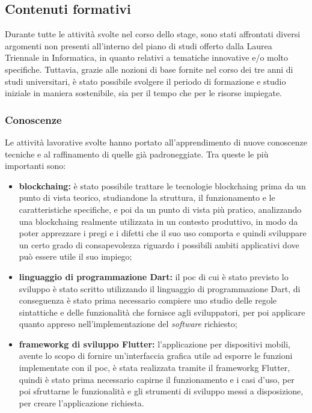 \subsection{Contenuti formativi}

Durante tutte le attività svolte nel corso dello stage, sono stati affrontati diversi argomenti non presenti all'interno del piano di studi offerto dalla Laurea Triennale in Informatica, in quanto relativi a tematiche innovative e/o molto specifiche. Tuttavia, grazie alle nozioni di base fornite nel corso dei tre anni di studi universitari, è stato possibile svolgere il periodo di formazione e studio iniziale in maniera sostenibile, sia per il tempo che per le risorse impiegate.    

\subsubsection*{Conoscenze}

Le attività lavorative svolte hanno portato all'apprendimento di nuove conoscenze tecniche e al raffinamento di quelle già padroneggiate. Tra queste le più importanti sono:

\begin{itemize}
	\item \textbf{\gls{blockchaing}:} è stato possibile trattare le tecnologie \gls{blockchaing} prima da un punto di vista teorico, studiandone la struttura, il funzionamento e le caratteristiche specifiche, e poi da un punto di vista più pratico, analizzando una \gls{blockchaing} realmente utilizzata in un contesto produttivo, in modo da poter apprezzare i pregi e i difetti che il suo uso comporta e quindi sviluppare un certo grado di consapevolezza riguardo i possibili ambiti applicativi dove può essere utile il suo impiego;
	\item \textbf{linguaggio di programmazione Dart:} il \gls{poc} di cui è stato previsto lo sviluppo è stato scritto utilizzando il linguaggio di programmazione Dart, di conseguenza è stato prima necessario compiere uno studio delle regole sintattiche e delle funzionalità che fornisce agli sviluppatori, per poi applicare quanto appreso nell'implementazione del \textit{software} richiesto;
	\item \textbf{\gls{frameworkg} di sviluppo Flutter:} l'applicazione per dispositivi mobili, avente lo scopo di fornire un'interfaccia grafica utile ad esporre le funzioni implementate con il \gls{poc}, è stata realizzata tramite il \gls{frameworkg} Flutter, quindi è stato prima necessario capirne il funzionamento e i casi d'uso, per poi sfruttarne le funzionalità e gli strumenti di sviluppo messi a disposizione, per creare l'applicazione richiesta.
\end{itemize}

